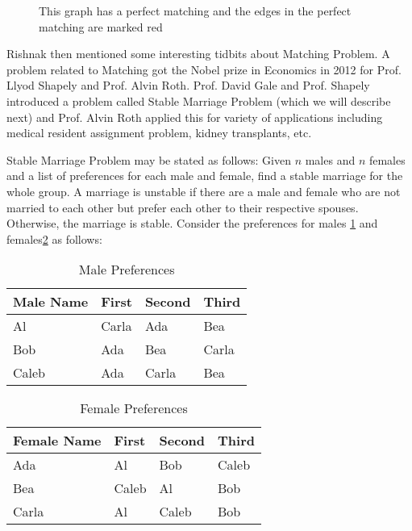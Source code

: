 \begin{figure}
\begin{center}
\caption{ This graph has a perfect matching and the edges in the perfect matching are marked red}\label{16g2}
\end{center}
\end{figure}
Rishnak then mentioned some interesting tidbits about Matching Problem.
A problem related to Matching got the Nobel prize in Economics in 2012 for Prof. Llyod Shapely and 
Prof. Alvin Roth.  Prof. David Gale and Prof. Shapely introduced a problem called Stable Marriage Problem (which we will describe next) and Prof. Alvin Roth applied this for variety of applications including medical resident assignment problem, kidney transplants, etc.

Stable Marriage Problem may be stated as follows:
Given $n$ males and $n$ females and a list of preferences for each male and female, find a stable marriage for the whole group.
A marriage is unstable if there are a male and female who are not married to each other but prefer each other to their respective spouses. Otherwise, the marriage is stable.
Consider the preferences for males \ref{16t1} and females\ref{16t2} as follows:
\begin{table}
\begin{center}
\begin{tabular}{ |p{3cm}||p{1.5cm}||p{1.5cm} || p{1.5cm}|| }
 \hline
 \hline
 Male Name & First&Second&Third\\
 \hline
 Al  & Carla    &Ada&Bea\\
Bob&Ada&Bea&Carla\\
Caleb&Ada&Carla&Bea\\
 
 
 \hline
\end{tabular}
\caption{Male Preferences}\label{16t1}
\end{center}
\end{table}
\begin{table}
\begin{center}
\begin{tabular}{ |p{3cm}||p{1.5cm}||p{1.5cm} || p{1.5cm}|| }
 \hline
 \hline
 Female Name & First&Second&Third\\
 \hline
 Ada  & Al    &Bob&Caleb\\
Bea&Caleb&Al&Bob\\
Carla&Al&Caleb&Bob\\
 
 
 \hline
\end{tabular}
\caption{Female Preferences}\label{16t2}
\end{center}
\end{table}

